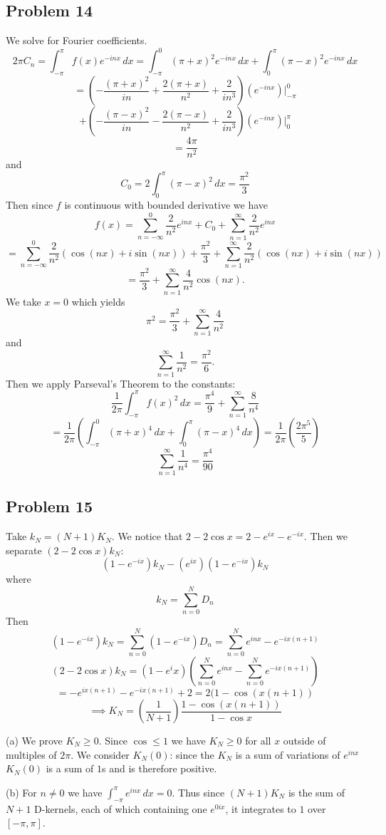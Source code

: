 \documentclass{amsart}
\begin{document}
\subsection*{Problem 14}
We solve for Fourier coefficients.
\[2\pi C_n=\int_{-\pi}^{\pi}f(x)e^{-inx}\,dx = \int_{-\pi}^0(\pi+x)^2e^{-inx}\,dx + \int_0^\pi(\pi-x)^2e^{-inx}\,dx\]
\[=\left(-\frac{(\pi+x)^2}{in}+\frac{2(\pi+x)}{n^2}+\frac{2}{in^3}\right)(e^{-inx})\Bigg|_{-\pi}^0\]
\[+\left(-\frac{(\pi-x)^2}{in}-\frac{2(\pi-x)}{n^2}+\frac{2}{in^3}\right)(e^{-inx})\Bigg|_0^\pi\]
\[=\frac{4\pi}{n^2}\]
and \[C_0=2\int_0^\pi(\pi-x)^2\,dx=\frac{\pi^2}{3}\]
Then since $f$ is continuous with bounded derivative we have 
\[f(x)=\sum_{n=-\infty}^0\frac{2}{n^2}e^{inx}+ C_0+ \sum_{n=1}^\infty\frac{2}{n^2}e^{inx}\]
\[=\sum_{n=-\infty}^0\frac{2}{n^2}(\cos(nx)+i\sin(nx))+ \frac{\pi^2}{3}+ \sum_{n=1}^\infty\frac{2}{n^2}(\cos(nx)+i\sin(nx))\]
\[=\frac{\pi^2}{3}+\sum_{n=1}^\infty\frac{4}{n^2}\cos(nx).\]
We take $x=0$ which yields \[\pi^2=\frac{\pi^2}{3}+\sum_{n=1}^\infty\frac{4}{n^2}\] and \[\sum_{n=1}^\infty\frac{1}{n^2}=\frac{\pi^2}{6}.\]
Then we apply Parseval's Theorem to the constants:
\[\frac{1}{2\pi}\int_{-\pi}^\pi f(x)^2\,dx=\frac{\pi^4}{9}+\sum_{n=1}^\infty\frac{8}{n^4}\]
\[=\frac{1}{2\pi}\left(\int_{-\pi}^0(\pi+x)^4\,dx + \int_0^\pi(\pi-x)^4\,dx\right)=\frac{1}{2\pi}(\frac{2\pi^5}{5})\]
\[\sum_{n=1}^\infty\frac{1}{n^4}=\frac{\pi^4}{90}\]

\subsection*{Problem 15}
Take $k_N = (N+1)K_N$. We notice that $2-2\cos x = 2-e^{ix}-e^{-ix}$. Then we separate $(2-2\cos x)k_N$:
\[(1-e^{-ix})k_N-(e^{ix})(1-e^{-ix})k_N\] where \[k_N=\sum_{n=0}^N D_n\]
Then \[(1-e^{-ix})k_N=\sum_{n=0}^N(1-e^{-ix})D_n=\sum_{n=0}^Ne^{inx}-e^{-ix(n+1)}\]
\[(2-2\cos x)k_N=(1-e^ix)\left(\sum_{n=0}^Ne^{inx}-\sum_{n=0}^Ne^{-ix(n+1)}\right)\]
\[=-e^{ix(n+1)}-e^{-ix(n+1)}+2=2(1-\cos(x(n+1))\]
\[\implies K_N=\left(\frac{1}{N+1}\right)\frac{1-\cos(x(n+1))}{1-\cos x}\]

\medskip \noindent (a) We prove $K_N\geq 0$. Since $\cos\leq 1$ we have $K_N\geq 0$ for all $x$ outside of multiples of $2\pi$. We consider $K_N(0)$: since the $K_N$ is a sum of variations of $e^{inx}$ $K_N(0)$ is a sum of $1$s and is therefore positive.

\medskip \noindent (b) For $n\neq 0$ we have $\int_{-\pi}^\pi e^{inx}\,dx=0$. Thus since $(N+1)K_N$ is the sum of $N+1$ D-kernels, each of which containing one $e^{0ix}$, it integrates to $1$ over $[-\pi, \pi]$. 
\end{document}
